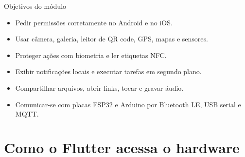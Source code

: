 \documentclass[aspectratio=169,10pt]{beamer}
\begin{document}
\capa

\begin{frame}{Objetivos do módulo}
  \begin{conceito}
    \begin{itemize}
      \item Pedir permissões corretamente no Android e no iOS.
      \item Usar câmera, galeria, leitor de QR code, GPS, mapas e sensores.
      \item Proteger ações com biometria e ler etiquetas NFC.
      \item Exibir notificações locais e executar tarefas em segundo plano.
      \item Compartilhar arquivos, abrir links, tocar e gravar áudio.
      \item Comunicar-se com placas ESP32 e Arduino por Bluetooth LE, USB serial e MQTT.
    \end{itemize}
  \end{conceito}
\end{frame}

\sumario



\section{Como o Flutter acessa o hardware}
\end{document}
